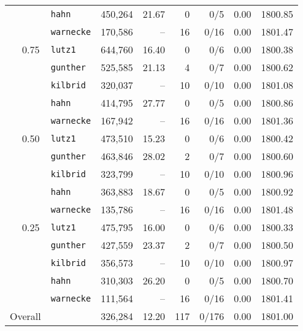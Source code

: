 \begin{table}[tpb]
\begin{tabular}{cclrrrrrr}
		&		& {\tt hahn}	& 450,264 & 21.67 & 0 & 0/5 & 0.00 & 1800.85 \\
		&		& {\tt warnecke}	& 170,586 & -- & 16 & 0/16 & 0.00 & 1801.47 \\
		& 0.75	& {\tt lutz1}	& 644,760 & 16.40 & 0 & 0/6 & 0.00 & 1800.38 \\
		&		& {\tt gunther}	& 525,585 & 21.13 & 4 & 0/7 & 0.00 & 1800.62 \\
		&		& {\tt kilbrid}	& 320,037 & -- & 10 & 0/10 & 0.00 & 1801.08 \\
		&		& {\tt hahn}	& 414,795 & 27.77 & 0 & 0/5 & 0.00 & 1800.86 \\
		&		& {\tt warnecke}	& 167,942 & -- & 16 & 0/16 & 0.00 & 1801.36 \\
		& 0.50	& {\tt lutz1}	& 473,510 & 15.23 & 0 & 0/6 & 0.00 & 1800.42 \\
		&		& {\tt gunther}	& 463,846 & 28.02 & 2 & 0/7 & 0.00 & 1800.60 \\
		&		& {\tt kilbrid}	& 323,799 & -- & 10 & 0/10 & 0.00 & 1800.96 \\
		&		& {\tt hahn}	& 363,883 & 18.67 & 0 & 0/5 & 0.00 & 1800.92 \\
		&		& {\tt warnecke}	& 135,786 & -- & 16 & 0/16 & 0.00 & 1801.48 \\
		& 0.25	& {\tt lutz1}	& 475,795 & 16.00 & 0 & 0/6 & 0.00 & 1800.33 \\
		&		& {\tt gunther}	& 427,559 & 23.37 & 2 & 0/7 & 0.00 & 1800.50 \\
		&		& {\tt kilbrid}	& 356,573 & -- & 10 & 0/10 & 0.00 & 1800.97 \\
		&		& {\tt hahn}	& 310,303 & 26.20 & 0 & 0/5 & 0.00 & 1800.70 \\
		&		& {\tt warnecke}	& 111,564 & -- & 16 & 0/16 & 0.00 & 1801.41 \\[1mm]
		\multicolumn{2}{l}{Overall} & & 326,284 & 12.20 & 117 & 0/176 & 0.00 & 1801.00 \\
		\bottomrule
	\end{tabular}
	\label{tab:appen:mipSCBF}
\end{table}



